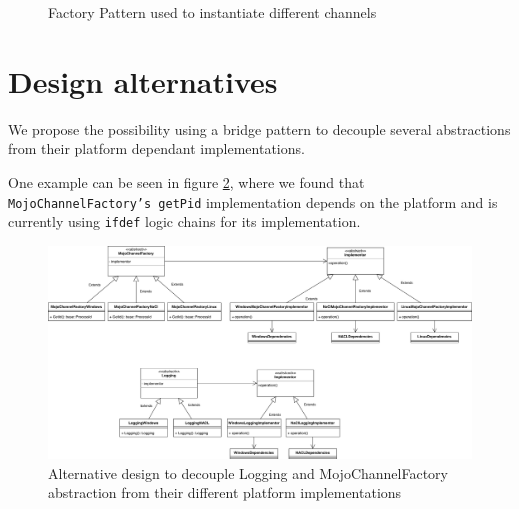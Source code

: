 \begin{figure}[H]
    \centering
    \caption{Factory Pattern used to instantiate different channels}
    \label{fig:factory}
\end{figure}


\section{Design alternatives} 
\label{sec:bridge}

We propose the possibility using a bridge pattern to decouple several abstractions from their platform dependant implementations. 

One example can be seen in figure \ref{fig:alt}, where we found that \texttt{MojoChannelFactory's getPid} implementation depends on the platform and is currently using \texttt{ifdef} logic chains for its implementation.
\begin{figure}
    \centering
    \includegraphics[width=\textwidth]{img/alt.png}
    \caption{Alternative design to decouple Logging and MojoChannelFactory abstraction from their different platform implementations}
    \label{fig:alt}
\end{figure}